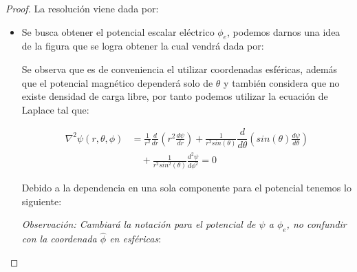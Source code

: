 \begin{problema}
\begin{center}
\end{center}
\end{problema}
\begin{proof}
    La resolución viene dada por:
    \begin{itemize}
        \item Se busca obtener el potencial escalar eléctrico $\phi_{e}$, podemos darnos una idea de la figura que se logra obtener la cual vendrá dada por:
        
        Se observa que es de conveniencia el utilizar coordenadas esféricas, además que el potencial magnético dependerá solo de $\theta$ y también considera que no existe densidad de carga libre, por tanto podemos utilizar la ecuación de Laplace tal que:
        
        \begin{equation}
            \begin{aligned}
                \nabla^{2}\psi (r,\theta,\phi) &= \frac{1}{r^{2}}\frac{d}{dr}\left(r^{2}\frac{d\psi}{dr}\right) + \frac{1}{r^{2}sin(\theta)}\dfrac{d}{d\theta}\left(sin(\theta) \frac{d\psi}{d\theta}\right) \\
                &\quad + \frac{1}{r^{2}sin^{2}(\theta) }\frac{d^{2}\psi}{d\phi^{2}} = 0
            \end{aligned}
        \end{equation}
        
        Debido a la dependencia en una sola componente para el potencial tenemos lo siguiente:

        \textit{Observación: Cambiará la notación para el potencial de $\psi$ a $\phi_{e}$, no confundir con la coordenada $\hat{\phi}$ en esféricas}: 
        

\end{itemize}
\end{proof}
